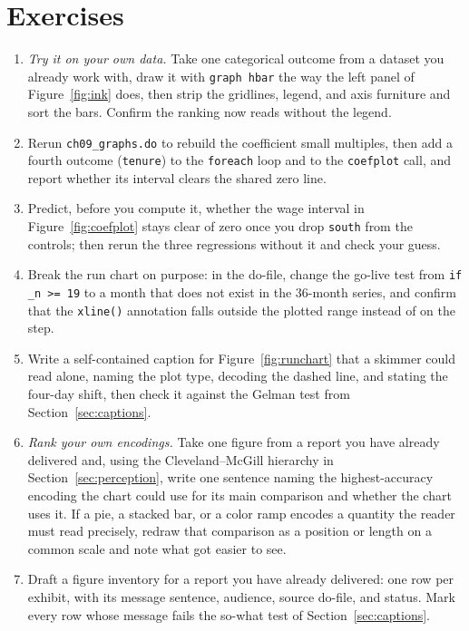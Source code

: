 \documentclass[
    a4paper,
    fontsize=10pt,
    twoside=true,
    numbers=noenddot,
]{kaobook}
\begin{document}
\section*{Exercises}
\begin{enumerate}
  \item \emph{Try it on your own data.} Take one categorical
        outcome from a dataset you already work with, draw it
        with \texttt{graph hbar} the way the left panel of
        Figure~\ref{fig:ink} does, then strip the gridlines,
        legend, and axis furniture and sort the bars. Confirm
        the ranking now reads without the legend.
  \item Rerun \texttt{ch09\_graphs.do} to rebuild the coefficient
        small multiples, then add a fourth outcome
        (\texttt{tenure}) to the \texttt{foreach} loop and to the
        \texttt{coefplot} call, and report whether its interval
        clears the shared zero line.
  \item Predict, before you compute it, whether the wage
        interval in Figure~\ref{fig:coefplot} stays clear of zero
        once you drop \texttt{south} from the controls; then rerun
        the three regressions without it and check your guess.
  \item Break the run chart on purpose: in the do-file, change
        the go-live test from \texttt{if \_n >= 19} to a month
        that does not exist in the 36-month series, and confirm
        that the \texttt{xline()} annotation falls outside the plotted
        range instead of on the step.
  \item Write a self-contained caption for
        Figure~\ref{fig:runchart} that a skimmer could read alone,
        naming the plot type, decoding the dashed line, and
        stating the four-day shift, then check it against the
        Gelman test from Section~\ref{sec:captions}.
  \item \emph{Rank your own encodings.} Take one figure from a
        report you have already delivered and, using the
        Cleveland--McGill hierarchy in Section~\ref{sec:perception},
        write one sentence naming the highest-accuracy encoding the
        chart could use for its main comparison and whether the
        chart uses it. If a pie, a stacked bar, or a color ramp encodes
        a quantity the reader must read precisely, redraw
        that comparison as a position or length on a common scale
        and note what got easier to see.
  \item Draft a figure inventory for a report you have already
        delivered: one row per exhibit, with its message sentence,
        audience, source do-file, and status. Mark every row whose
        message fails the so-what test of
        Section~\ref{sec:captions}.
\end{enumerate}
\end{document}
